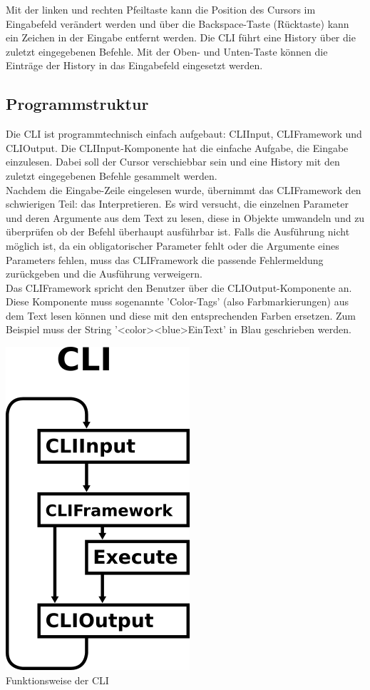 \documentclass[12pt,a4paper]{report}
\begin{document}
\begin{onehalfspace}
Mit der linken und rechten Pfeiltaste kann die Position des Cursors im Eingabefeld verändert werden und über die Backspace-Taste (Rücktaste) kann ein Zeichen in der Eingabe entfernt werden. Die CLI führt eine History über die zuletzt eingegebenen Befehle. Mit der Oben- und Unten-Taste können die Einträge der History in das Eingabefeld eingesetzt werden.

\subsection{Programmstruktur}

Die CLI ist programmtechnisch einfach aufgebaut: CLIInput, CLIFramework und CLIOutput. Die CLIInput-Komponente hat die einfache Aufgabe, die Eingabe einzulesen. Dabei soll der Cursor verschiebbar sein und eine History mit den zuletzt eingegebenen Befehle gesammelt werden.\\
Nachdem die Eingabe-Zeile eingelesen wurde, übernimmt das CLIFramework den schwierigen Teil: das Interpretieren. Es wird versucht, die einzelnen Parameter und deren Argumente aus dem Text zu lesen, diese in Objekte umwandeln und zu überprüfen ob der Befehl überhaupt ausführbar ist. Falls die Ausführung nicht möglich ist, da ein obligatorischer Parameter fehlt oder die Argumente eines Parameters fehlen, muss das CLIFramework die passende Fehlermeldung zurückgeben und die Ausführung verweigern.\\
Das CLIFramework spricht den Benutzer über die CLIOutput-Komponente an. Diese Komponente muss sogenannte 'Color-Tags' (also Farbmarkierungen) aus dem Text lesen können und diese mit den entsprechenden Farben ersetzen. Zum Beispiel muss der String '\textless color\textgreater \textless blue\textgreater EinText' in Blau geschrieben werden.

\begin{center}
\includegraphics[scale=2.0]{img/mad_cli.png}\\
Funktionsweise der CLI
\end{center}


\end{onehalfspace}
\end{document}
